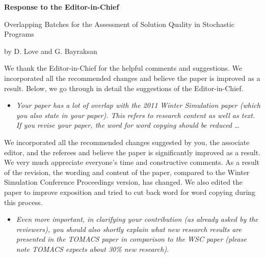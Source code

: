 \documentclass[11pt,notitlepage,onecolumn]{article}
\newcommand{\noi}{\noindent}
\begin{document}

\singlespacing

\baselineskip0.26in


\pagebreak

\begin{center}
\textbf{\Large Response to the Editor-in-Chief} \medskip

{\large Overlapping Batches for the Assessment of Solution Quality in Stochastic Programs} \medskip

{\footnotesize by D. Love and G. Bayraksan}
\end{center}

\bigskip


\noi
We thank the Editor-in-Chief for the helpful comments and suggestions. 
We incorporated all the recommended changes and believe the paper is improved as a result. 
Below, we go through in detail the suggestions of the Editor-in-Chief.\medskip


\begin{itemize}
\item[] \textit{Your paper has a lot of overlap with the 2011 Winter Simulation paper  (which you also state in your paper). 
This refers to research content as well as text. 
If you revise your paper, the word for word copying should be reduced \ldots}
\end{itemize}

\noindent  
We incorporated all the recommended changes suggested by you, the associate editor, and the referees and believe the paper is significantly improved as a result.
We very much appreciate everyone's time and constructive comments. 
As a result of the revision, the wording and content of the paper, compared to the Winter Simulation Conference Proceedings version, has changed.
We also edited the paper to improve exposition and tried to cut back word for word copying during this process.  
\medskip 

\begin{itemize}
\item[]\textit{Even more important, in clarifying your contribution (as already asked by the reviewers), you should also shortly explain what new research results are presented in the  TOMACS paper in comparison to the WSC paper (please note TOMACS expects about 30\% new research).}
\end{itemize}
\end{document}
